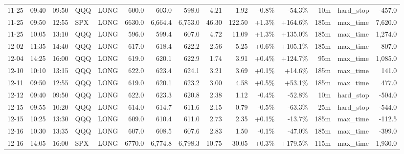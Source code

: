 \documentclass[11pt,a4paper,twoside]{article}
\begin{document}
\begin{landscape}
\begin{center}
\begin{longtable}{>{\color{txtmain}}l l l l l r r r r r r r r >{\color{txtmain}}l r}
11-25 & 09:40 & 09:50 & QQQ & LONG & 600.0 & 603.0 & 598.0 & 4.21 & 1.92 & \textcolor{lossred}{-0.8\%} & \textcolor{lossred}{-54.3\%} & 10m & hard\_stop & \textcolor{lossred}{-457.0} \\
11-25 & 09:50 & 12:55 & SPX & LONG & 6630.0 & 6,664.4 & 6,753.0 & 46.30 & 122.50 & \textcolor{wingreen}{+1.3\%} & \textcolor{wingreen}{+164.6\%} & 185m & max\_time & \textcolor{wingreen}{7,620.0} \\
11-25 & 10:05 & 13:10 & QQQ & LONG & 596.0 & 599.4 & 607.0 & 4.72 & 11.09 & \textcolor{wingreen}{+1.3\%} & \textcolor{wingreen}{+135.0\%} & 185m & max\_time & \textcolor{wingreen}{1,274.0} \\
12-02 & 11:35 & 14:40 & QQQ & LONG & 617.0 & 618.4 & 622.2 & 2.56 & 5.25 & \textcolor{wingreen}{+0.6\%} & \textcolor{wingreen}{+105.1\%} & 185m & max\_time & \textcolor{wingreen}{807.0} \\
12-04 & 14:25 & 16:00 & QQQ & LONG & 619.0 & 620.1 & 622.9 & 1.74 & 3.91 & \textcolor{wingreen}{+0.4\%} & \textcolor{wingreen}{+124.7\%} & 95m & max\_time & \textcolor{wingreen}{1,085.0} \\
12-10 & 10:10 & 13:15 & QQQ & LONG & 622.0 & 623.4 & 624.1 & 3.21 & 3.69 & \textcolor{wingreen}{+0.1\%} & \textcolor{wingreen}{+14.6\%} & 185m & max\_time & \textcolor{wingreen}{141.0} \\
12-11 & 09:50 & 12:55 & QQQ & LONG & 619.0 & 620.1 & 623.2 & 3.00 & 4.58 & \textcolor{wingreen}{+0.5\%} & \textcolor{wingreen}{+53.1\%} & 185m & max\_time & \textcolor{wingreen}{477.0} \\
12-12 & 09:40 & 09:50 & QQQ & LONG & 622.0 & 623.3 & 620.8 & 2.38 & 1.12 & \textcolor{lossred}{-0.4\%} & \textcolor{lossred}{-52.8\%} & 10m & hard\_stop & \textcolor{lossred}{-504.0} \\
12-15 & 09:55 & 10:20 & QQQ & LONG & 614.0 & 614.7 & 611.6 & 2.15 & 0.79 & \textcolor{lossred}{-0.5\%} & \textcolor{lossred}{-63.3\%} & 25m & hard\_stop & \textcolor{lossred}{-544.0} \\
12-15 & 10:25 & 13:30 & QQQ & LONG & 609.0 & 610.4 & 611.0 & 2.73 & 2.35 & \textcolor{wingreen}{+0.1\%} & \textcolor{lossred}{-13.7\%} & 185m & max\_time & \textcolor{lossred}{-112.5} \\
12-16 & 10:30 & 13:35 & QQQ & LONG & 607.0 & 608.5 & 607.6 & 2.83 & 1.50 & \textcolor{lossred}{-0.1\%} & \textcolor{lossred}{-47.0\%} & 185m & max\_time & \textcolor{lossred}{-399.0} \\
12-16 & 14:05 & 16:00 & SPX & LONG & 6770.0 & 6,774.8 & 6,798.3 & 10.75 & 30.05 & \textcolor{wingreen}{+0.3\%} & \textcolor{wingreen}{+179.5\%} & 115m & max\_time & \textcolor{wingreen}{1,930.0} \\

\end{longtable}
\end{center}
\end{landscape}
\end{document}
